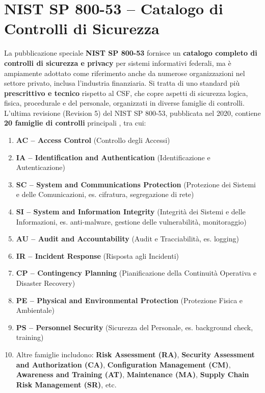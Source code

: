 \section{NIST SP 800-53 – Catalogo di Controlli di Sicurezza}
\label{sec:nist_sp_800_53}
La pubblicazione speciale \textbf{NIST SP 800-53} fornisce un \textbf{catalogo completo di controlli di sicurezza e privacy} per sistemi informativi federali, ma è ampiamente adottato come riferimento anche da numerose organizzazioni nel settore privato, inclusa l'industria finanziaria. Si tratta di uno standard più \textbf{prescrittivo e tecnico} rispetto al CSF, che copre aspetti di sicurezza logica, fisica, procedurale e del personale, organizzati in diverse famiglie di controlli. L'ultima revisione (Revision 5) del NIST SP 800-53, pubblicata nel 2020, contiene \textbf{20 famiglie di controlli} principali , tra cui:
\begin{enumerate}
    \item \textbf{AC – Access Control} (Controllo degli Accessi)
    \item \textbf{IA – Identification and Authentication} (Identificazione e Autenticazione)
    \item \textbf{SC – System and Communications Protection} (Protezione dei Sistemi e delle Comunicazioni, es. cifratura, segregazione di rete)
    \item \textbf{SI – System and Information Integrity} (Integrità dei Sistemi e delle Informazioni, es. anti-malware, gestione delle vulnerabilità, monitoraggio)
    \item \textbf{AU – Audit and Accountability} (Audit e Tracciabilità, es. logging)
    \item \textbf{IR – Incident Response} (Risposta agli Incidenti)
    \item \textbf{CP – Contingency Planning} (Pianificazione della Continuità Operativa e Disaster Recovery)
    \item \textbf{PE – Physical and Environmental Protection} (Protezione Fisica e Ambientale)
    \item \textbf{PS – Personnel Security} (Sicurezza del Personale, es. background check, training)
    \item Altre famiglie includono: \textbf{Risk Assessment (RA)}, \textbf{Security Assessment and Authorization (CA)}, \textbf{Configuration Management (CM)}, \textbf{Awareness and Training (AT)}, \textbf{Maintenance (MA)}, \textbf{Supply Chain Risk Management (SR)}, etc.
\end{enumerate}

